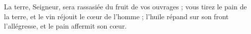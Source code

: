 La terre, Seigneur, sera rassasiée du fruit de vos ouvrages ; vous tirez le pain de la terre, et le vin réjouit le cœur de l’homme ; l’huile répand sur son front l’allégresse, et le pain affermit son cœur.
